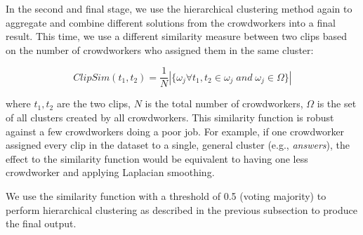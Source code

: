 In the second and final stage, we use the hierarchical clustering method again
to aggregate and combine different solutions from the crowdworkers into a final
result. This time, we use a different similarity measure between two clips
based on the number of crowdworkers who assigned them in the same cluster:


\begin{equation}
	ClipSim(t_1, t_2) = \frac{1}{N} |\{\omega_j \forall t_1, t_2 \in \omega_j \; and \; \omega_j \in \Omega\}|
\end{equation}

where $t_1, t_2$ are the two clips, $N$ is the total number of crowdworkers,
$\Omega$ is the set of all clusters created by all crowdworkers. This
similarity function is robust against a few crowdworkers doing a
poor job. For example, if one crowdworker assigned every clip in the dataset to
a single, general cluster (e.g., \emph{answers}), the effect to the similarity function
would be equivalent to having one less crowdworker and applying Laplacian smoothing.

We use the similarity function with a threshold of 0.5 (voting majority) to
perform hierarchical clustering as described in the previous subsection to
produce the final output.


